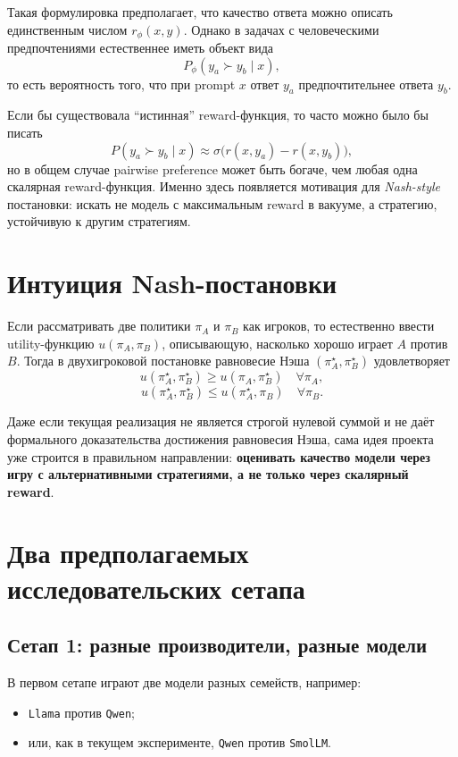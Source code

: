 \documentclass[11pt,a4paper]{article}
\begin{document}
Такая формулировка предполагает, что качество ответа можно описать единственным числом $r_\phi(x,y)$. Однако в задачах с человеческими предпочтениями естественнее иметь объект вида
\[
P_\phi(y_a \succ y_b \mid x),
\]
то есть вероятность того, что при prompt $x$ ответ $y_a$ предпочтительнее ответа $y_b$.

Если бы существовала ``истинная'' reward-функция, то часто можно было бы писать
\[
P(y_a \succ y_b \mid x) \approx \sigma\bigl(r(x,y_a)-r(x,y_b)\bigr),
\]
но в общем случае pairwise preference может быть богаче, чем любая одна скалярная reward-функция. Именно здесь появляется мотивация для \textit{Nash-style} постановки: искать не модель с максимальным reward в вакууме, а стратегию, устойчивую к другим стратегиям.

\section{Интуиция Nash-постановки}

Если рассматривать две политики $\pi_A$ и $\pi_B$ как игроков, то естественно ввести utility-функцию $u(\pi_A,\pi_B)$, описывающую, насколько хорошо играет $A$ против $B$. Тогда в двухигроковой постановке равновесие Нэша $(\pi_A^\star,\pi_B^\star)$ удовлетворяет
\[
u(\pi_A^\star,\pi_B^\star) \ge u(\pi_A,\pi_B^\star)
\quad \forall \pi_A,
\]
\[
u(\pi_A^\star,\pi_B^\star) \le u(\pi_A^\star,\pi_B)
\quad \forall \pi_B.
\]

Даже если текущая реализация не является строгой нулевой суммой и не даёт формального доказательства достижения равновесия Нэша, сама идея проекта уже строится в правильном направлении: \textbf{оценивать качество модели через игру с альтернативными стратегиями, а не только через скалярный reward}.

\section{Два предполагаемых исследовательских сетапа}

\subsection{Сетап 1: разные производители, разные модели}

В первом сетапе играют две модели разных семейств, например:
\begin{itemize}
  \item \texttt{Llama} против \texttt{Qwen};
  \item или, как в текущем эксперименте, \texttt{Qwen} против \texttt{SmolLM}.
\end{itemize}
\end{document}
